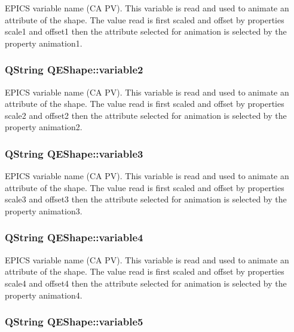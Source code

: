\label{classQEShape_ab5e680419c4f3586303ac436241fac79}
EPICS variable name (CA PV). This variable is read and used to animate an attribute of the shape. The value read is first scaled and offset by properties scale1 and offset1 then the attribute selected for animation is selected by the property animation1. \hypertarget{classQEShape_ae897cceb66ecad101bc4bd7899fcef5a}{
\subsubsection[{variable2}]{\setlength{\rightskip}{0pt plus 5cm}QString QEShape::variable2}}
\label{classQEShape_ae897cceb66ecad101bc4bd7899fcef5a}
EPICS variable name (CA PV). This variable is read and used to animate an attribute of the shape. The value read is first scaled and offset by properties scale2 and offset2 then the attribute selected for animation is selected by the property animation2. \hypertarget{classQEShape_aa602068abe671e12dec4be3e1fd6997a}{
\subsubsection[{variable3}]{\setlength{\rightskip}{0pt plus 5cm}QString QEShape::variable3}}
\label{classQEShape_aa602068abe671e12dec4be3e1fd6997a}
EPICS variable name (CA PV). This variable is read and used to animate an attribute of the shape. The value read is first scaled and offset by properties scale3 and offset3 then the attribute selected for animation is selected by the property animation3. \hypertarget{classQEShape_a070d6c64cd7a1573890f046d4c7ef5f4}{
\subsubsection[{variable4}]{\setlength{\rightskip}{0pt plus 5cm}QString QEShape::variable4}}
\label{classQEShape_a070d6c64cd7a1573890f046d4c7ef5f4}
EPICS variable name (CA PV). This variable is read and used to animate an attribute of the shape. The value read is first scaled and offset by properties scale4 and offset4 then the attribute selected for animation is selected by the property animation4. \hypertarget{classQEShape_a63e072e89a4f7f09f074a786d02a02f3}{
\subsubsection[{variable5}]{\setlength{\rightskip}{0pt plus 5cm}QString QEShape::variable5}}
